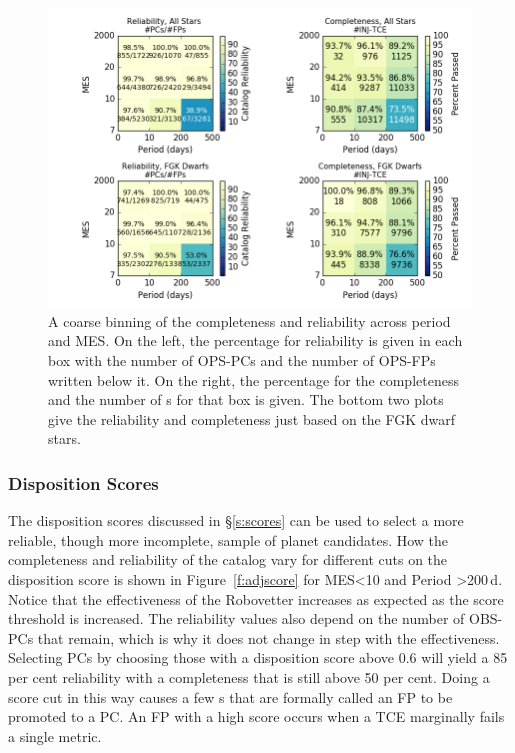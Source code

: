 \begin{figure}[h!]
\begin{center}
\includegraphics[width=0.95\linewidth]{fig-completeReliabilityCard.png}
\caption{\label{f:score} A coarse binning of the completeness and reliability across period and MES. On the left, the percentage for reliability is given in each box with the number of OPS-PCs and the number of OPS-FPs written below it.  On the right, the percentage for the completeness and the number of \injtce s for that box is given. The bottom two plots give the reliability and completeness just based on the FGK dwarf stars. }
\end{center}
\end{figure}


\subsubsection{Disposition Scores}

The disposition scores discussed in \S\ref{s:scores} can be used to select a more reliable, though more incomplete, sample of planet candidates.  How the completeness and reliability of the catalog vary for different cuts on the disposition score is shown in Figure~\ref{f:adjscore} for MES<10 and Period >200\,d. Notice that the effectiveness of the Robovetter increases as expected as the score threshold is increased.  The reliability values also depend on the number of OBS-PCs that remain, which is why it does not change in step with the effectiveness.  Selecting PCs by choosing those with a disposition score above 0.6 will yield a 85 per cent reliability with a completeness that is still above 50 per cent. Doing a score cut in this way causes a few \opstce s that are formally called an FP to be promoted to a PC. An FP with a high score occurs when a TCE marginally fails a single metric.

